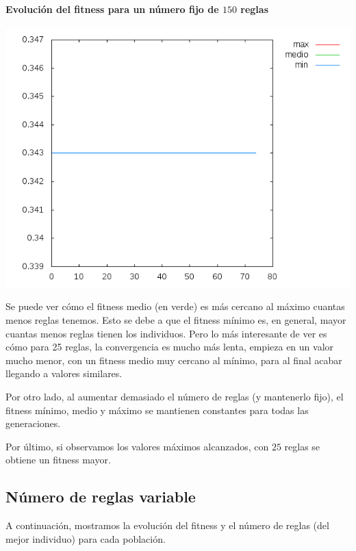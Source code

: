 \documentclass[nochap]{apuntes}
\begin{document}
\paragraph{Evolución del fitness para un número fijo de $150$ reglas}
\begin{center}
\includegraphics[scale=0.5]{tex/img/g75_p75_MejoresPorPeores_SeleccionProporcionalAlFitness_reg150.png}
\end{center}

Se puede ver cómo el fitness medio (en verde) es más cercano al máximo cuantas menos reglas tenemos. Esto se debe a que el fitness mínimo es, en general, mayor cuantas menos reglas tienen los individuos. Pero lo más interesante de ver es cómo para 25 reglas, la convergencia es mucho más lenta, empieza en un valor mucho menor, con un fitness medio muy cercano al mínimo, para al final acabar llegando a valores similares.

Por otro lado, al aumentar demasiado el número de reglas (y mantenerlo fijo), el fitness mínimo, medio y máximo se mantienen constantes para todas las generaciones.

Por último, si observamos los valores máximos alcanzados, con $25$ reglas se obtiene un fitness mayor.


\subsection{Número de reglas variable}

A continuación, mostramos la evolución del fitness y el número de reglas (del mejor individuo) para cada población.
\end{document}
